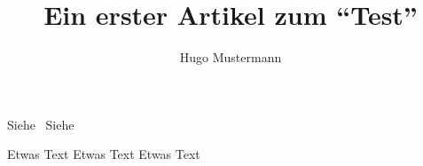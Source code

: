 \documentclass{dtk2}
\author{Hugo Mustermann}
\begin{document}
\title{Ein erster Artikel zum "`Test"'}

\maketitle
\nocite{*}
Siehe~\cite{knuth:ct:a}
Siehe~\cite{companion}

Etwas Text \clearpage
Etwas Text \clearpage
Etwas Text \clearpage

\printbibliography
\end{document}
